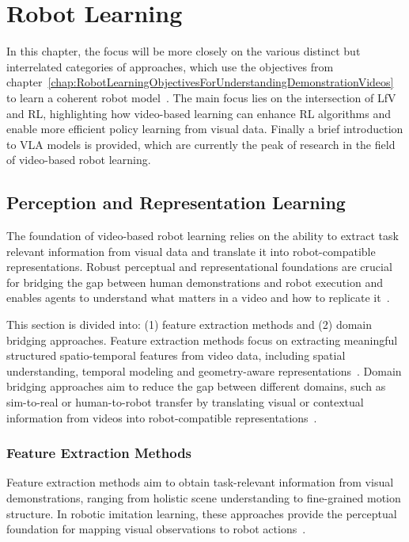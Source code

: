 

\chapter{Robot Learning}
\label{chap:RobotLearningApproaches}
\minitoc
In this chapter, the focus will be more closely on the various distinct but interrelated categories of approaches, which use the objectives from chapter~\ref{chap:RobotLearningObjectivesForUnderstandingDemonstrationVideos} to learn a coherent robot model~\cite{Eze2024LearningBW}. The main focus lies on the intersection of \ac{LfV} and \ac{RL}, highlighting how video-based learning can enhance \ac{RL} algorithms and enable more efficient policy learning from visual data. Finally a brief introduction to \ac{VLA} models is provided, which are currently the peak of research in the field of video-based robot learning.

\section{Perception and Representation Learning}
\label{sec:PerceptionAndRepresentationLearning}
The foundation of video-based robot learning relies on the ability to extract task relevant information from visual data and translate it into robot-compatible representations. Robust perceptual and representational foundations are crucial for bridging the gap between human demonstrations and robot execution and enables agents to understand what matters in a video and how to replicate it~\cite{Eze2024LearningBW}. 


This section is divided into: (1) feature extraction methods and (2) domain bridging approaches. Feature extraction methods focus on extracting meaningful structured spatio-temporal features from video data, including spatial understanding, temporal modeling and geometry-aware representations~\cite{Eze2024LearningBW}. Domain bridging approaches aim to reduce the gap between different domains, such as sim-to-real or human-to-robot transfer by translating visual or contextual information from videos into robot-compatible representations~\cite{Eze2024LearningBW}.




\subsection{Feature Extraction Methods}
Feature extraction methods aim to obtain task-relevant information from visual demonstrations, ranging from holistic scene understanding to fine-grained motion structure. In robotic imitation learning, these approaches provide the perceptual foundation for mapping visual observations to robot actions~\cite{Eze2024LearningBW}.



